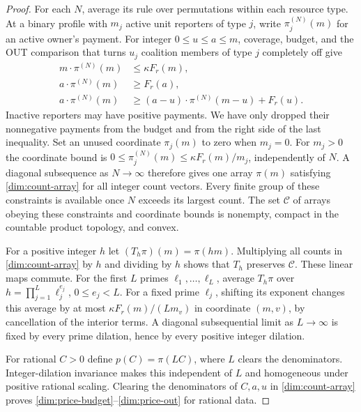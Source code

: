 \begin{proof}
For each $N$, average its rule over permutations within each resource
type. At a binary profile with $m_j$ active unit reporters of type $j$,
write $\pi_j^{(N)}(m)$ for an active owner's payment. For integer
$0\le u\le a\le m$, coverage, budget, and the OUT comparison that
turns $u_j$ coalition members of type $j$ completely off give
\begin{align}
 m\cdot\pi^{(N)}(m)&\le\kappa F_r(m),\nonumber\\
 a\cdot\pi^{(N)}(m)&\ge F_r(a),\label{dim:count-array}\\
 a\cdot\pi^{(N)}(m)&\ge
 (a-u)\cdot\pi^{(N)}(m-u)+F_r(u).\nonumber
\end{align}
Inactive reporters may have positive payments. We have only dropped their
nonnegative payments from the budget and from the right side of the last
inequality. Set an unused coordinate $\pi_j(m)$ to zero when $m_j=0$.
For $m_j>0$ the coordinate bound is
$0\le\pi_j^{(N)}(m)\le\kappa F_r(m)/m_j$, independently of $N$.
A diagonal subsequence as $N\to\infty$ therefore gives one array
$\pi(m)$ satisfying \eqref{dim:count-array} for all integer count vectors.
Every finite group of these constraints is available once $N$ exceeds
its largest count. The set $\mathcal C$ of arrays obeying these constraints
and coordinate bounds is nonempty, compact in the countable product
topology, and convex.

For a positive integer $h$ let $(T_h\pi)(m)=\pi(hm)$.
Multiplying all counts in \eqref{dim:count-array} by $h$ and dividing by
$h$ shows that $T_h$ preserves $\mathcal C$. These linear maps commute.
For the first $L$ primes $\ell_1,\ldots,\ell_L$, average $T_h\pi$ over
$h=\prod_{j=1}^L\ell_j^{e_j}$, $0\le e_j<L$.
For a fixed prime $\ell_j$, shifting its exponent changes this average
by at most $\kappa F_r(m)/(Lm_v)$ in coordinate $(m,v)$, by cancellation
of the interior terms. A diagonal subsequential limit as $L\to\infty$
is fixed by every prime dilation, hence by every positive integer dilation.

For rational $C>0$ define $p(C)=\pi(LC)$, where $L$ clears the
denominators. Integer-dilation invariance makes this independent of $L$
and homogeneous under positive rational scaling. Clearing the
denominators of $C,a,u$ in \eqref{dim:count-array} proves
\eqref{dim:price-budget}--\eqref{dim:price-out} for rational data.


\end{proof}
